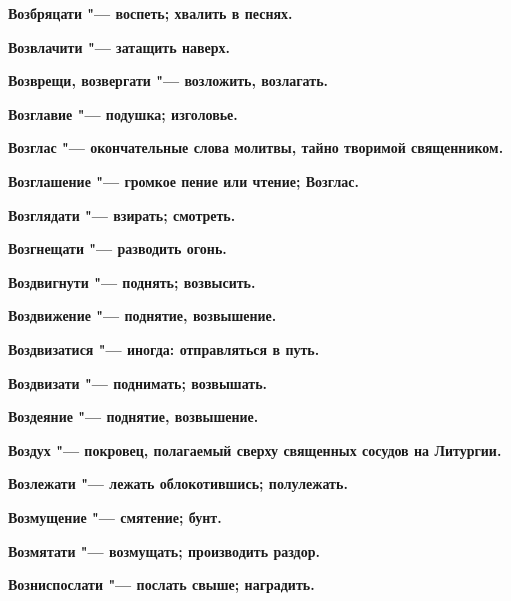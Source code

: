 \begin{mymulticols}{2}
\bfseries Возбряцати\normalfont{} "--- воспеть; хвалить в песнях. 




\bfseries Возвлачити\normalfont{} "--- затащить наверх. 




\bfseries Возврещи, возвергати\normalfont{} "--- возложить, возлагать. 




\bfseries Возглавие\normalfont{} "--- подушка; изголовье. 




\bfseries Возглас\normalfont{} "--- окончательные слова молитвы, тайно творимой священником. 




\bfseries Возглашение\normalfont{} "--- громкое пение или чтение; Возглас. 




\bfseries Возглядати\normalfont{} "--- взирать; смотреть. 




\bfseries Возгнещати\normalfont{} "--- разводить огонь. 




\bfseries Воздвигнути\normalfont{} "--- поднять; возвысить. 




\bfseries Воздвижение\normalfont{} "--- поднятие, возвышение. 




\bfseries Воздвизатися\normalfont{} "--- иногда: отправляться в путь. 




\bfseries Воздвизати\normalfont{} "--- поднимать; возвышать. 




\bfseries Воздеяние\normalfont{} "--- поднятие, возвышение. 




\bfseries Воздух\normalfont{} "--- покровец, полагаемый сверху священных сосудов на Литургии. 




\bfseries Возлежати\normalfont{} "--- лежать облокотившись; полулежать. 




\bfseries Возмущение\normalfont{} "--- смятение; бунт. 




\bfseries Возмятати\normalfont{} "--- возмущать; производить раздор. 




\bfseries Возниспослати\normalfont{} "--- послать свыше; наградить. 





\end{mymulticols}
